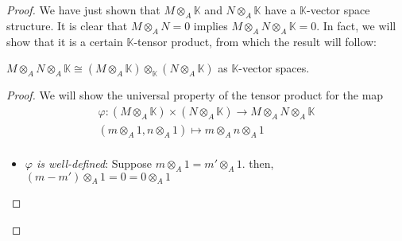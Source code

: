 \begin{problem}
\begin{enumerate}[label=(\theproblem.\arabic*),ref=\theproblem.\arabic*]
\begin{sol}
\begin{proof}
                    We have just shown that $M \otimes_A \mathbb{K}$ and $N \otimes_A \mathbb{K}$ have a $\mathbb{K}$-vector space structure.
                    It is clear that $M \otimes_A N = 0$ implies $M \otimes_A  N \otimes_A \mathbb{K} = 0$.
                    In fact, we will show that it is a certain $\mathbb{K}$-tensor product, from which the result will follow:

                    \begin{claim}
                        $M \otimes_A N \otimes_A \mathbb{K} \cong (M \otimes_A \mathbb{K}) \otimes_{\mathbb{K}} (N \otimes_A \mathbb{K})$ as $\mathbb{K}$-vector spaces.
                            \begin{proof}

                                We will show the universal property of the tensor product for the map
                                \begin{align*}
                                    \varphi: (M \otimes_A \mathbb{K}) \times (N \otimes_A \mathbb{K}) \rightarrow M \otimes_A N \otimes_A \mathbb{K} \\
                                    (m \otimes_A 1, n \otimes_A 1) \mapsto m \otimes_A n \otimes_A 1 \\
                                \end{align*}

                                \begin{itemize}
                                    \item \emph{$\varphi$ is well-defined}: Suppose $m \otimes_A 1 = m' \otimes_A 1$.
                                    then, $(m - m') \otimes_A 1 = 0 = 0 \otimes_A 1$





\end{itemize}
\end{proof}
\end{claim}
\end{proof}
\end{sol}
\end{enumerate}
\end{problem}
